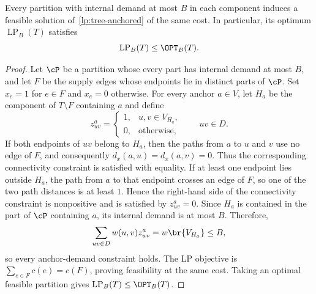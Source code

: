 \begin{lemma}\label{lem:tree-anchored-relaxation}
    Every partition with internal demand at most $B$ in each component induces a feasible solution of~\eqref{lp:tree-anchored} of the same cost. In particular, its optimum $\operatorname{LP}_B(T)$ satisfies
    \[
        \operatorname{LP}_B(T)\leq\OPT_B(T).
    \]
\end{lemma}
\begin{proof}
    Let $\cP$ be a partition whose every part has internal demand at most $B$, and let $F$ be the supply edges whose endpoints lie in distinct parts of $\cP$. Set $x_e=1$ for $e\in F$ and $x_e=0$ otherwise. For every anchor $a\in V$, let $H_a$ be the component of $T\setminus F$ containing $a$ and define
    \[
        z^a_{uv}=\begin{cases}
            1,&u,v\in V_{H_a},\\
            0,&\text{otherwise},
        \end{cases}
        \qquad uv\in D.
    \]
    If both endpoints of $uv$ belong to $H_a$, then the paths from $a$ to $u$ and $v$ use no edge of $F$, and consequently $d_x(a,u)=d_x(a,v)=0$. Thus the corresponding connectivity constraint is satisfied with equality. If at least one endpoint lies outside $H_a$, the path from $a$ to that endpoint crosses an edge of $F$, so one of the two path distances is at least $1$. Hence the right-hand side of the connectivity constraint is nonpositive and is satisfied by $z^a_{uv}=0$. Since $H_a$ is contained in the part of $\cP$ containing $a$, its internal demand is at most $B$. Therefore,
    \[
        \sum_{uv\in D}w(u,v)z^a_{uv}=w\br{V_{H_a}}\leq B,
    \]
    so every anchor-demand constraint holds. The LP objective is $\sum_{e\in F}c(e)=c(F)$, proving feasibility at the same cost. Taking an optimal feasible partition gives $\operatorname{LP}_B(T)\leq\OPT_B(T)$.
\end{proof}

